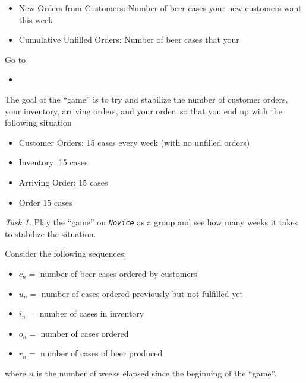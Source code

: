 \begin{itemize}
\item New Orders from Customers: Number of beer cases your new customers want this week
\item Cumulative Unfilled Orders: Number of beer cases that your 
\end{itemize}




\newpage

\begin{graybox}
Go to 
\begin{itemize}
	\item {}	
\end{itemize}
\end{graybox}

The goal of the ``game'' is to try and stabilize the number of customer orders, your inventory, arriving orders, and your order, so that you end up with the following situation
\begin{itemize}
\item Customer Orders: 15 cases every week (with no unfilled orders)
\item Inventory: 15 cases
\item Arriving Order: 15 cases
\item Order 15 cases
\end{itemize}


\emph{Task 1.} Play the ``game'' on \emph{\tt Novice} as a group and see how many weeks it takes to stabilize the situation.

Consider the following sequences:
\begin{itemize}
\item $c_n = $ number of beer cases ordered by customers
\item $u_n = $ number of cases ordered previously but not fulfilled yet
\item $i_n = $ number of cases in inventory
\item $o_n = $ number of cases ordered 
\item $r_n = $ number of cases of beer produced
\end{itemize}
where $n$ is the number of weeks elapsed since the beginning of the ``game''. \\

